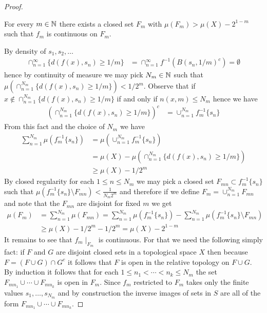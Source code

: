 \begin{proof}
\begin{clm}For every $m \in \mathbb{N}$ there exists a closed set $F_m$ with $\mu(F_m) > \mu(X) - 2^{1-m}$ such that $f_m$ is continuous on $F_m$.
\end{clm}
By density of $s_1, s_2, \dotsc$
\begin{align*}
\cap_{n=1}^\infty \lbrace d(f(x), s_n) \geq 1/m \rbrace &= \cap_{n=1}^\infty f^{-1} (B(s_n, 1/m)^c) = \emptyset
\end{align*}
hence by continuity of measure we may pick $N_m \in \mathbb{N}$ such that $\mu \left(\cap_{n=1}^{N_m} \lbrace d(f(x), s_n) \geq 1/m \rbrace \right) < 1/2^m$.  
Observe that if $x \notin \cap_{n=1}^{N_m} \lbrace d(f(x), s_n) \geq 1/m \rbrace$ if and only if $n(x,m) \leq N_m$ hence we have
\begin{align*}
\left(\cap_{n=1}^{N_m} \lbrace d(f(x), s_n) \geq 1/m \rbrace \right)^c &= \cup_{n=1}^{N_m} f_m^{-1} \lbrace s_n \rbrace
\end{align*}
From this fact and the choice of $N_m$ we have
\begin{align*}
\sum_{n=1}^{N_m}\mu \left( f_m^{-1} \lbrace s_n \rbrace \right) &= \mu \left( \cup_{n=1}^{N_m} f_m^{-1} \lbrace s_n \rbrace \right) \\
& = \mu(X) - \mu \left(\cap_{n=1}^{N_m} \lbrace d(f(x), s_n) \geq 1/m \rbrace \right) \\
&\geq \mu(X) - 1/2^m
\end{align*}
By closed regularity for each $1 \leq n \leq N_m$ we may pick a closed set $F_{mn} \subset f_m^{-1} \lbrace s_n \rbrace$ such that $\mu(f_m^{-1} \lbrace s_n \rbrace  \setminus F_{mn}) < \frac{1}{N_m 2^m}$ and therefore if we define $F_m = \cup_{n=1}^{N_m} F_{mn}$ and note that the $F_{mn}$ are disjoint for fixed $m$ we get
\begin{align*}
\mu(F_m) &= \sum_{n=1}^{N_m} \mu(F_{mn}) = \sum_{n=1}^{N_m} \mu(f_m^{-1} \lbrace s_n \rbrace) - \sum_{n=1}^{N_m} \mu(f_m^{-1} \lbrace s_n \rbrace  \setminus F_{mn})  \\
&\geq \mu(X) - 1/2^m - 1/2^m = \mu(X) - 2^{1-m}
\end{align*}
It remains to see that $f_m \mid_{F_m}$ is continuous.  For that we need the following simply fact: if $F$ and $G$ are disjoint closed sets in a topological space $X$ then because $F = (F \cup G) \cap G^c$ it follows that $F$ is open in the relative topology on $F \cup G$.  By induction it follows that for each $1 \leq  n_1 < \dotsb < n_k  \leq N_m$ the set $F_{mn_1} \cup \dotsb \cup F_{mn_k}$ is open in $F_m$.  Since $f_m$ restricted to $F_m$ takes only the finite values $s_1, \dotsc, s_{N_m}$ and by construction the inverse images of sets in $S$ are all of the form $F_{mn_1} \cup \dotsb \cup F_{mn_k}$.


\end{proof}
